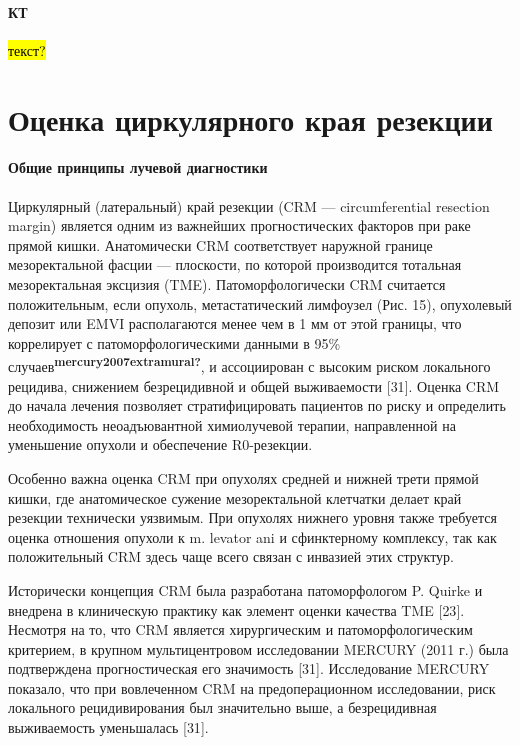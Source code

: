 \documentclass[
  russian,
  12pt,
  a4paper,
]{report}
\begin{document}
\subsubsection{КТ}\label{ux43aux442-2}

\hl{текст?}

\chapter{Оценка циркулярного края
резекции}\label{ux43eux446ux435ux43dux43aux430-ux446ux438ux440ux43aux443ux43bux44fux440ux43dux43eux433ux43e-ux43aux440ux430ux44f-ux440ux435ux437ux435ux43aux446ux438ux438}

\subsubsection{Общие принципы лучевой
диагностики}\label{ux43eux431ux449ux438ux435-ux43fux440ux438ux43dux446ux438ux43fux44b-ux43bux443ux447ux435ux432ux43eux439-ux434ux438ux430ux433ux43dux43eux441ux442ux438ux43aux438-3}

Циркулярный (латеральный) край резекции (CRM --- circumferential
resection margin) является одним из важнейших прогностических факторов
при раке прямой кишки. Анатомически CRM соответствует наружной границе
мезоректальной фасции --- плоскости, по которой производится тотальная
мезоректальная эксцизия (TME). Патоморфологически CRM считается
положительным, если опухоль, метастатический лимфоузел (Рис. 15),
опухолевый депозит или EMVI располагаются менее чем в 1 мм от этой
границы, что коррелирует с патоморфологическими данными в 95\%
случаев\textsuperscript{\textbf{mercury2007extramural?}}, и ассоциирован
с высоким риском локального рецидива, снижением безрецидивной и общей
выживаемости {[}31{]}. Оценка CRM до начала лечения позволяет
стратифицировать пациентов по риску и определить необходимость
неоадъювантной химиолучевой терапии, направленной на уменьшение опухоли
и обеспечение R0-резекции.

Особенно важна оценка CRM при опухолях средней и нижней трети прямой
кишки, где анатомическое сужение мезоректальной клетчатки делает край
резекции технически уязвимым. При опухолях нижнего уровня также
требуется оценка отношения опухоли к m. levator ani и сфинктерному
комплексу, так как положительный CRM здесь чаще всего связан с инвазией
этих структур.

Исторически концепция CRM была разработана патоморфологом P. Quirke и
внедрена в клиническую практику как элемент оценки качества TME
{[}23{]}. Несмотря на то, что CRM является хирургическим и
патоморфологическим критерием, в крупном мультицентровом исследовании
MERCURY (2011 г.) была подтверждена прогностическая его значимость
{[}31{]}. Исследование MERCURY показало, что при вовлеченном CRM на
предоперационном исследовании, риск локального рецидивирования был
значительно выше, а безрецидивная выживаемость уменьшалась {[}31{]}.
\end{document}
